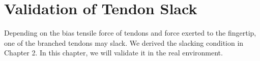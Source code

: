 \documentclass{llncs}
\begin{document}


\section{Validation of Tendon Slack} %
\label{sec:verification}
Depending on the bias tensile force of tendons and force exerted to the fingertip,
one of the branched tendons may slack.
We derived the slacking condition in Chapter 2.
In this chapter, we will validate it in the real environment.

\end{document}
